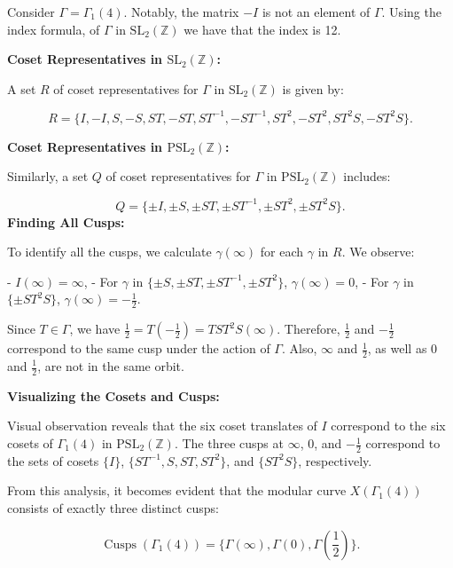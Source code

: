 \begin{example}\cite{visser_computing_2023}


Consider \( \Gamma = \Gamma_{1}(4) \). Notably, the matrix \( -I \) is not an element of \( \Gamma \). Using the index formula, of \( \Gamma \) in \( \mathrm{SL}_{2}(\mathbb{Z}) \) we have that the index is 12.

\textbf{Coset Representatives in \( \mathrm{SL}_{2}(\mathbb{Z}) \):}

A set \( R \) of coset representatives for \( \Gamma \) in \( \mathrm{SL}_{2}(\mathbb{Z}) \) is given by:

\[
R = \{I, -I, S, -S, ST, -ST, ST^{-1}, -ST^{-1}, ST^2, -ST^2, ST^2S, -ST^2S\}.
\]

\textbf{Coset Representatives in \( \mathrm{PSL}_{2}(\mathbb{Z}) \):}

Similarly, a set \( Q \) of coset representatives for \( \Gamma \) in \( \mathrm{PSL}_{2}(\mathbb{Z}) \) includes:

\[
Q = \{\pm I, \pm S, \pm ST, \pm ST^{-1}, \pm ST^2, \pm ST^2S\}.
\]
\textbf{Finding All Cusps:}

To identify all the cusps, we calculate \( \gamma(\infty) \) for each \( \gamma \) in \( R \). We observe:

- \( I(\infty) = \infty \),
- For \( \gamma \) in \( \{\pm S, \pm ST, \pm ST^{-1}, \pm ST^2\} \), \( \gamma(\infty) = 0 \),
- For \( \gamma \) in \( \{\pm ST^2S\} \), \( \gamma(\infty) = -\frac{1}{2} \).

Since \( T \in \Gamma \), we have \( \frac{1}{2} = T(-\frac{1}{2}) = TST^2S(\infty) \). Therefore, \( \frac{1}{2} \) and \( -\frac{1}{2} \) correspond to the same cusp under the action of \( \Gamma \). Also, \( \infty \) and \( \frac{1}{2} \), as well as \( 0 \) and \( \frac{1}{2} \), are not in the same orbit.

\textbf{Visualizing the Cosets and Cusps:}

Visual observation reveals that the six coset translates of \( I \) correspond to the six cosets of \( \Gamma_{1}(4) \) in \( \mathrm{PSL}_{2}(\mathbb{Z}) \). The three cusps at \( \infty \), \( 0 \), and \( -\frac{1}{2} \) correspond to the sets of cosets \( \{I\} \), \( \{ST^{-1}, S, ST, ST^2\} \), and \( \{ST^2S\} \), respectively.

From this analysis, it becomes evident that the modular curve \( X(\Gamma_{1}(4)) \) consists of exactly three distinct cusps:

\[
\operatorname{Cusps}(\Gamma_{1}(4)) = \{\Gamma(\infty), \Gamma(0), \Gamma(\frac{1}{2})\}.
\]
    
\end{example}

